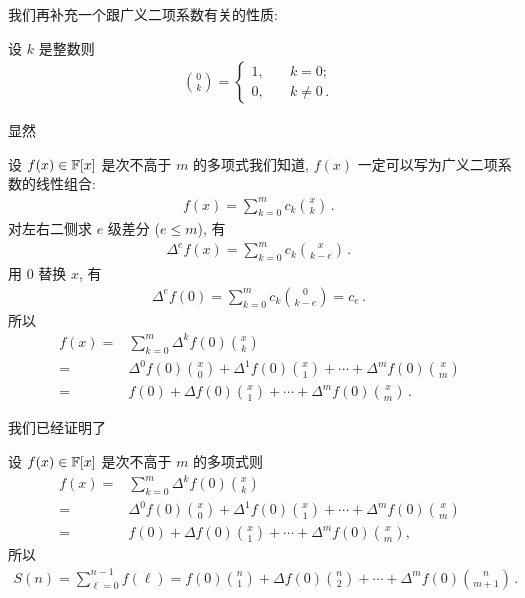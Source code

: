 我们再补充一个跟广义二项系数有关的性质:

\begin{proposition}
    设 $k$ 是整数\period 则
    \begin{align*}
        \binom{0}{k} = \begin{cases}
            1, & \quad k = 0;           \\
            0, & \quad k \neq 0 \period
        \end{cases}
    \end{align*}
\end{proposition}

\begin{pf}
    显然\period
\end{pf}

设 $f(x) \in \mathbb{F}[x]$ 是次不高于 $m$ 的多项式\period 我们知道, $f(x)$ 一定可以写为广义二项系数的线性组合:
\begin{align*}
    f(x) = \sum_{k = 0}^{m} c_{k} \binom{x}{k} \period
\end{align*}
对左右二侧求 $e$ 级差分 ($e \leq m$), 有
\begin{align*}
    \Delta^e f(x) = \sum_{k = 0}^{m} c_{k} \binom{x}{k - e} \period
\end{align*}
用 $0$ 替换 $x$, 有
\begin{align*}
    \Delta^e f(0) = \sum_{k = 0}^{m} c_{k} \binom{0}{k - e} = c_{e} \period
\end{align*}
所以
\begin{align*}
    f(x)
    = {} & \sum_{k = 0}^{m} \Delta^k f(0) \binom{x}{k}                                                   \\
    = {} & \Delta^0 f(0) \binom{x}{0} + \Delta^1 f(0) \binom{x}{1} + \cdots + \Delta^m f(0) \binom{x}{m} \\
    = {} & f(0) + \Delta f(0) \binom{x}{1} + \cdots + \Delta^m f(0) \binom{x}{m} \period
\end{align*}

我们已经证明了

\begin{proposition}
    设 $f(x) \in \mathbb{F}[x]$ 是次不高于 $m$ 的多项式\period 则
    \begin{align*}
        f(x)
        = {} & \sum_{k = 0}^{m} \Delta^k f(0) \binom{x}{k}                                                   \\
        = {} & \Delta^0 f(0) \binom{x}{0} + \Delta^1 f(0) \binom{x}{1} + \cdots + \Delta^m f(0) \binom{x}{m} \\
        = {} & f(0) + \Delta f(0) \binom{x}{1} + \cdots + \Delta^m f(0) \binom{x}{m},
    \end{align*}
    所以
    \begin{align*}
        S(n) = \sum_{\ell = 0}^{n - 1} f(\ell) = f(0) \binom{n}{1} + \Delta f(0) \binom{n}{2} + \cdots + \Delta^{m} f(0) \binom{n}{m + 1} \period
    \end{align*}
\end{proposition}

